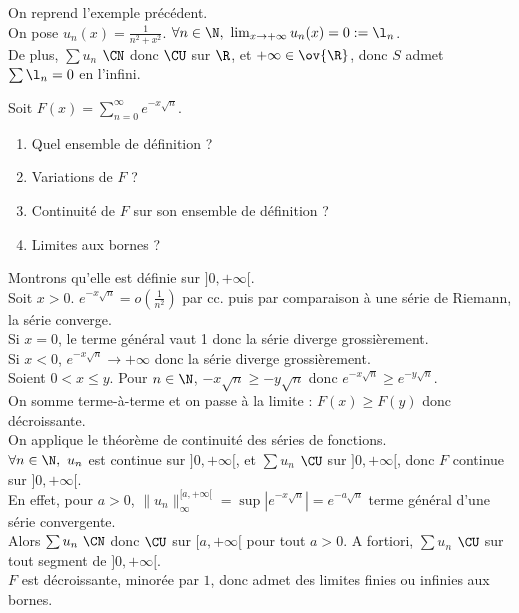 \documentclass[11pt]{article}
\begin{document}
\begin{ex}{}{}
    On reprend l'exemple précédent.\\
    On pose $u_n(x)=\frac{1}{n^2+x^2}$. $\forall n \in \N, ~ \lim_{x\to+\infty}u_n(x)=0:=\l_n$.\\
    De plus, $\sum u_n$ $\CN$ donc $\CU$ sur $\R$, et $+\infty\in\ov{\R}$, donc $S$ admet $\sum\l_n=0$ en l'infini. 
\end{ex}

\begin{ex}{}{}
    Soit $F(x)=\sum_{n=0}^{\infty}e^{-x\sqrt{n}}$.
    \begin{enumerate}
        \item Quel ensemble de définition ?
        \item Variations de $F$ ?
        \item Continuité de $F$ sur son ensemble de définition ?
        \item Limites aux bornes ?
    \end{enumerate}
    \tcblower
     Montrons qu'elle est définie sur $]0,+\infty[$.\\
    Soit $x>0$. $e^{-x\sqrt{n}}=o(\frac{1}{n^2})$ par cc. puis par comparaison à une série de Riemann, la série converge.\\
    Si $x=0$, le terme général vaut 1 donc la série diverge grossièrement.\\
    Si $x<0$, $e^{-x\sqrt{n}}\to+\infty$ donc la série diverge grossièrement.\\
     Soient $0<x\leq y$. Pour $n\in\N$, $-x\sqrt{n}\geq-y\sqrt{n}$ donc $e^{-x\sqrt{n}}\geq e^{-y\sqrt{n}}$.\\
    On somme terme-à-terme et on passe à la limite : $F(x)\geq F(y)$ donc décroissante.\\
     On applique le théorème de continuité des séries de fonctions.\\
    $\forall n \in \N, ~ u_n$ est continue sur $]0,+\infty[$, et $\sum u_n$ $\CU$ sur $]0,+\infty[$, donc $F$ continue sur $]0,+\infty[$.\\
    En effet, pour $a>0$, $\|u_n\|_\infty^{[a,+\infty[}=\sup\left| e^{-x\sqrt{n}} \right| = e^{-a\sqrt{n}}$ terme général d'une série convergente.\\
    Alors $\sum u_n ~ \CN$ donc $\CU$ sur $[a,+\infty[$ pour tout $a>0$. A fortiori, $\sum u_n$ $\CU$ sur tout segment de $]0,+\infty[$.\\
     $F$ est décroissante, minorée par $1$, donc admet des limites finies ou infinies aux bornes.\\

\end{ex}
\end{document}
